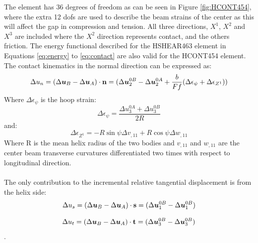 The element has 36 degrees of freedom as can be seen in Figure \ref{fig:HCONT454},  where the extra 12 dofs are used to describe the beam strains of the center as this will affect the gap in compression and tension. All three directions, $X^1$, $X^2$ and $X^3$ are included where the $X^2$ direction represents contact, and the others friction. The energy functional described for the HSHEAR463 element in Equations \ref{eq:energy} to \ref{eq:contact} are also valid for the HCONT454 element. The contact kinematics in the normal direction can be expressed as: 
\begin{equation}
    \Delta u_n=(\Delta \boldsymbol{u}_B-\Delta \boldsymbol{u}_A) \cdot \bold{n}=(\Delta \boldsymbol{u}_2^{0B}-\Delta \boldsymbol{u}_2^{0A}+\frac{b}{Ff}(\Delta \epsilon_\psi+\Delta \epsilon_{Z^1}))
\end{equation}
\noindent Where $ \Delta \epsilon_\psi$ is the hoop strain:
\begin{equation}
    \Delta \epsilon_\psi =\frac{\Delta u_3^{0A} + \Delta u_3^{0B}}{2R}
\end{equation}
and:
\begin{equation}
    \Delta \epsilon_{Z^1} = -R \sin \psi \Delta v_{,11} + R \cos \psi \Delta w_{,11}
\end{equation}
Where R is the mean helix radius of the two bodies and $v_{,11}$ and $w_{,11}$ are the center beam transverse curvatures differentiated  two times with respect to longitudinal direction. \\\\ The only contribution to the  incremental relative tangential displacement is from the helix side:
\begin{equation}
    \Delta u_s = (\Delta \boldsymbol{u}_B -\Delta \boldsymbol{u}_A) \cdot \bold{s}=(\Delta \boldsymbol{u}_1^{0B} -\Delta \boldsymbol{u}_1^{0B})
\end{equation}

\begin{equation}
    \Delta u_t = (\Delta \boldsymbol{u}_B -\Delta \boldsymbol{u}_A) \cdot \bold{t}=(\Delta \boldsymbol{u}_3^{0B} -\Delta \boldsymbol{u}_3^{0B})
\end{equation}. 

